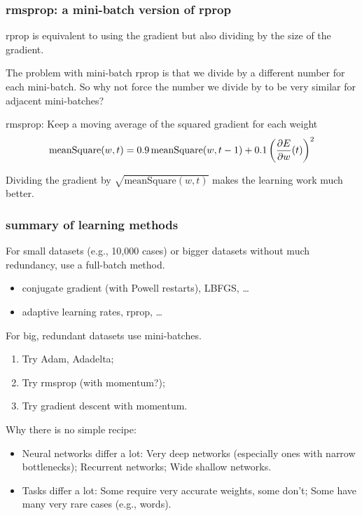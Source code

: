 \documentclass[USenglish,pdftex,compress,10pt,svgnamesi,handout]{beamer}
\begin{document}
\begin{frame}
\frametitle{rmsprop: a mini-batch version of rprop}
rprop is equivalent to using the gradient but also dividing by the size of the gradient.

The problem with mini-batch rprop is that we divide by a different number for each mini-batch. So why not force the number we divide by to be very similar for adjacent mini-batches?

\pause
rmsprop: Keep a moving average of the squared gradient for each weight
$$
\mathrm{meanSquare}(w,t) = 0.9\, \mathrm{meanSquare}(w,t-1)
	+ 0.1 \left({\partial E \over \partial w} (t)\right)^2
$$

Dividing the gradient by $\sqrt{\mathrm{meanSquare}(w, t)}$ makes the learning work much better.
\end{frame}


\begin{frame}
\frametitle{summary of learning methods}
For small datasets (e.g., 10,000 cases) or bigger datasets without much redundancy,
use a full-batch method.
\begin{itemize}
\item conjugate gradient (with Powell restarts), LBFGS, \dots
\item adaptive learning rates, rprop, \dots
\end{itemize}
 For big, redundant datasets use mini-batches.
\begin{enumerate}
\item Try Adam, Adadelta;
\item Try rmsprop (with momentum?);
\item Try gradient descent with momentum.
\end{enumerate}
Why there is no simple recipe:
\begin{itemize}
\item Neural networks differ a lot:  Very deep networks (especially ones with narrow bottlenecks);
  Recurrent networks;  Wide shallow networks. 
\item Tasks differ a lot:
  Some require very accurate weights, some don't;
  Some have many very rare cases (e.g., words).
  \end{itemize}
  \end{frame}
\end{document}
